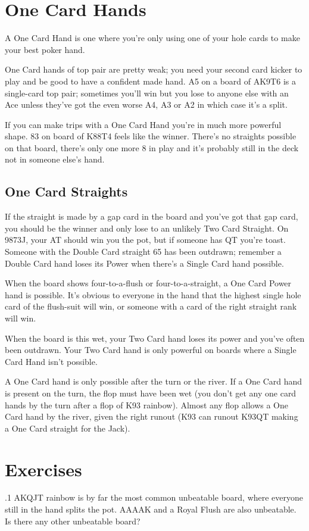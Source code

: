 \section{One Card Hands}

A One Card Hand is one where you're only using one of your hole
cards to make your best poker hand.

One Card hands of top pair are pretty weak; you need your second card
kicker to play and be good to have a confident made hand. A5 on a
board of AK9T6 is a single-card top pair; sometimes you'll win but you
lose to anyone else with an Ace unless they've got the even worse A4,
A3 or A2 in which case it's a split.

If you can make trips with a One Card Hand you're in much more
powerful shape. 83 on board of K88T4 feels like the winner. There's no
straights possible on that board, there's only one more 8 in play and
it's probably still in the deck not in someone else's hand.

\subsection{One Card Straights}

If the straight is made by a gap card in the board and you've got that
gap card, you should be the winner and only lose to an unlikely Two
Card Straight. On 9873J, your AT should win you the pot, but if
someone has QT you're toast. Someone with the Double Card straight 65
has been outdrawn; remember a Double Card hand loses its Power when
there's a Single Card hand possible.

When the board shows four-to-a-flush or four-to-a-straight, a One
Card Power hand is possible. It's obvious to everyone in the hand that
the highest single hole card of the flush-suit will win, or someone
with a card of the right straight rank will win.

When the board is this wet, your Two Card hand loses its power and
you've often been outdrawn. Your Two Card hand is only powerful on
boards where a Single Card Hand isn't possible.

A One Card hand is only possible after the turn or the river. If a
One Card hand is present on the turn, the flop must have been wet
(you don't get any one card hands by the turn after a flop of K93
rainbow). Almost any flop allows a One Card hand by the river,
given the right runout (K93 can runout K93QT making a One Card
straight for the Jack).

\section{Exercises}

.1 AKQJT rainbow is by far the most common unbeatable
board, where everyone still in the hand splits the pot. AAAAK and a
Royal Flush are also unbeatable. Is there any other unbeatable board?
